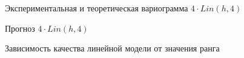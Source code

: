 \begin{figure}[H]
\caption{Экспериментальная и теоретическая вариограмма $ 4 \cdot Lin(h, 4) $}
\label{img:lin-fit-cv}
\end{figure}

\begin{figure}[H]
\caption{Прогноз $ 4 \cdot Lin(h, 4) $}
\label{img:lin-fit-cv-pred}
\end{figure}

\begin{figure}[ht]
\caption{Зависимость качества линейной модели от значения ранга}
\label{img:lin-range-adapt}
\end{figure}

